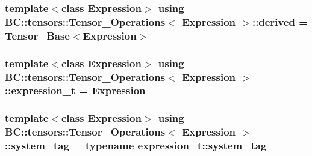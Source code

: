\subsubsection[{\texorpdfstring{derived}{derived}}]{\setlength{\rightskip}{0pt plus 5cm}template$<$class Expression$>$ using {\bf B\+C\+::tensors\+::\+Tensor\+\_\+\+Operations}$<$ Expression $>$\+::{\bf derived} =  {\bf Tensor\+\_\+\+Base}$<$Expression$>$}\hypertarget{structBC_1_1tensors_1_1Tensor__Operations_a830b9a11262226b18af9caef7b9da13b}{}\label{structBC_1_1tensors_1_1Tensor__Operations_a830b9a11262226b18af9caef7b9da13b}
\subsubsection[{\texorpdfstring{expression\+\_\+t}{expression_t}}]{\setlength{\rightskip}{0pt plus 5cm}template$<$class Expression$>$ using {\bf B\+C\+::tensors\+::\+Tensor\+\_\+\+Operations}$<$ Expression $>$\+::{\bf expression\+\_\+t} =  Expression}\hypertarget{structBC_1_1tensors_1_1Tensor__Operations_a963cb506586200de946d7f3c9a02c56d}{}\label{structBC_1_1tensors_1_1Tensor__Operations_a963cb506586200de946d7f3c9a02c56d}
\subsubsection[{\texorpdfstring{system\+\_\+tag}{system_tag}}]{\setlength{\rightskip}{0pt plus 5cm}template$<$class Expression$>$ using {\bf B\+C\+::tensors\+::\+Tensor\+\_\+\+Operations}$<$ Expression $>$\+::{\bf system\+\_\+tag} =  typename expression\+\_\+t\+::system\+\_\+tag}\hypertarget{structBC_1_1tensors_1_1Tensor__Operations_aeb2358dba2e022c48d925342d4bc34a2}{}\label{structBC_1_1tensors_1_1Tensor__Operations_aeb2358dba2e022c48d925342d4bc34a2}
